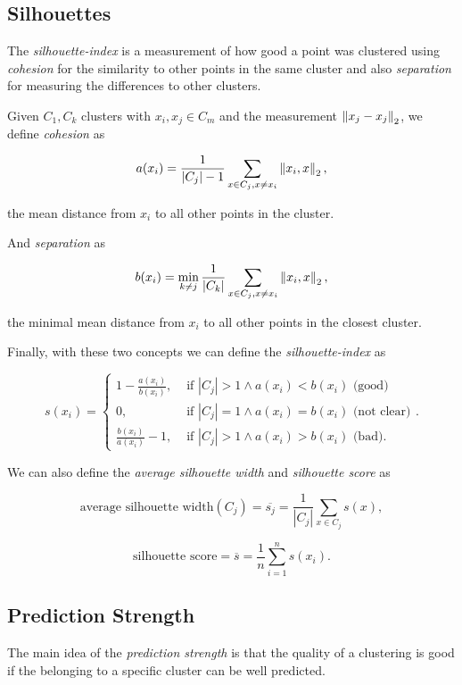 \subsection{Silhouettes}

The \emph{silhouette-index} is a measurement of how good a point was clustered using \emph{cohesion} for the similarity
to other points in the same cluster and also \emph{separation} for measuring the differences to other clusters.

Given \(C_1, C_k\) clusters with \(x_i, x_j \in C_m\) and the measurement \(\left\| x_j - x_j \right\|_2\), we define
\emph{cohesion} as

\[
	a(x_i) = \frac{1}{|C_j| - 1} \sum_{x \in C_j, x \ne x_i} \left\| x_i, x \right\|_2,
\]

the mean distance from \(x_i\) to all other points in the cluster.

And \emph{separation} as

\[
	b(x_i) = \min_{k \ne j} \frac{1}{|C_k|} \sum_{x \in C_j, x \ne x_i} \left\| x_i, x \right\|_2,
\]

the minimal mean distance from \(x_i\) to all other points in the closest cluster.

Finally, with these two concepts we can define the \emph{silhouette-index} as

\[
	s(x_i) =
	\begin{cases}
		1 - \frac{a(x_i)}{b(x_i)}, & \text{ if } |C_j| > 1 \land a(x_i) < b(x_i) \text{ (good)}      \\
		0,                         & \text{ if } |C_j| = 1 \land a(x_i) = b(x_i) \text{ (not clear)} \\
		\frac{b(x_i)}{a(x_i)} - 1, & \text{ if } |C_j| > 1 \land a(x_i) > b(x_i) \text{ (bad)}.
	\end{cases}.
\]

We can also define the \emph{average silhouette width} and \emph{silhouette score} as

\[
	\text{average silhouette width}(C_j) = \overline{s_j} = \frac{1}{|C_j|} \sum_{x \in C_j} s(x),
\]

\[
	\text{silhouette score}= \overline{s} = \frac{1}{n} \sum_{i = 1}^{n} s(x_i).
\]

\subsection{Prediction Strength}

The main idea of the \emph{prediction strength} is that the quality of a clustering is good if
the belonging to a specific cluster can be well predicted.

